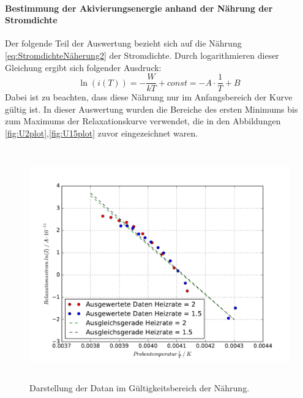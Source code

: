 \paragraph{Bestimmung der Akivierungsenergie anhand der Nährung der Stromdichte}
Der folgende Teil der Auswertung bezieht sich auf die Nährung \eqref{eq:StromdichteNäherung2} 
der Stromdichte. Durch logarithmieren dieser Gleichung ergibt sich folgender Ausdruck:
\begin{equation}
\ln(i(T)) = - \frac{W}{kT} + const  = - A \cdot \frac{1}{T} + B	
\label{eq:lnfit}
\end{equation}
Dabei ist zu beachten, dass diese Nährung nur im Anfangsbereich der Kurve gültig ist. 
In dieser Auswertung wurden die Bereiche des ersten Minimums bis zum Maximums der Relaxationskurve 
verwendet, die in den Abbildungen \ref{fig:U2plot},\ref{fig:U15plot} zuvor eingezeichnet waren.   


\begin{figure}
  \centering
  \includegraphics[height = 10cm]{plots/1.MethFitW.pdf}
  \caption{Darstellung der Datan im Gültigkeitsbereich der Nährung.}
  \label{fig:Meth1}
\end{figure}

